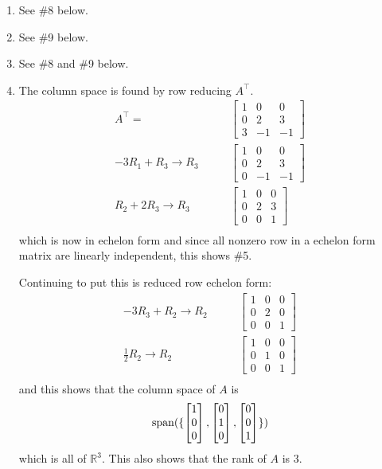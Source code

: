 \begin{example}
\begin{enumerate}
\item See \#8 below. 
\item See \#9 below. 
\item See \#8 and \#9 below. 

\item The column space is found by row reducing $A^{\intercal}$. 
%
\begin{align*}
A^{\intercal} = &\begin{bmatrix}
1 & 0 & 0 \\
0 & 2 & 3 \\
3 & -1 & -1 
\end{bmatrix} \\
-3 R_1 + R_3 \rightarrow R_3 \qquad & 
\begin{bmatrix}
1 &  0 & 0 \\
0 & 2 & 3\\
0 & -1 & -1 
\end{bmatrix} \\
R_2 + 2 R_3 \rightarrow R_3 \qquad & 
\begin{bmatrix}
1 &  0 & 0 \\
0 & 2 & 3\\
0 & 0 & 1 
\end{bmatrix} \\
\end{align*}
which is now in echelon form and since all nonzero row in a echelon form matrix are linearly independent, this shows \#5.  

Continuing to put this is reduced row echelon form:
\begin{align*}
-3R_3 + R_2 \rightarrow R_2 \qquad & 
\begin{bmatrix}
1 &  0 & 0 \\
0 & 2 & 0\\
0 & 0 & 1 
\end{bmatrix} \\
\frac{1}{2} R_2 \rightarrow R_2 \qquad & 
\begin{bmatrix}
1 &  0 & 0 \\
0 & 1 & 0\\
0 & 0 & 1 
\end{bmatrix} \\
\end{align*}
and this shows that the column space of $A$ is 
%
\begin{align*}
\operatorname{span}(\{ \begin{bmatrix}
1 \\ 0 \\ 0 
\end{bmatrix}, \begin{bmatrix}
0 \\ 1\\0 
\end{bmatrix}, \begin{bmatrix}
 0 \\ 0 \\ 1
\end{bmatrix} \} )
\end{align*}
which is all of $\mathbb{R}^3$.   This also shows that the rank of $A$ is 3. 


\end{enumerate}
\end{example}

